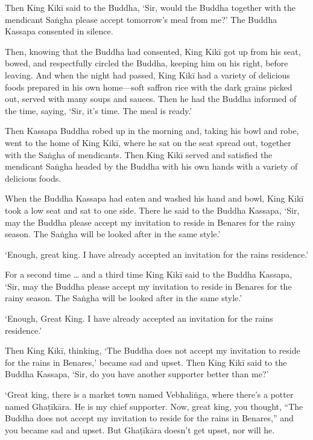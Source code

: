 \documentclass[12pt,openany]{book}%
\begin{document}
Then King \textsanskrit{Kikī} said to the Buddha, ‘Sir, would the Buddha together with the mendicant \textsanskrit{Saṅgha} please accept tomorrow’s meal from me?’ The Buddha Kassapa consented in silence. 

Then, knowing that the Buddha had consented, King \textsanskrit{Kikī} got up from his seat, bowed, and respectfully circled the Buddha, keeping him on his right, before leaving. And when the night had passed, King \textsanskrit{Kikī} had a variety of delicious foods prepared in his own home—soft saffron rice with the dark grains picked out, served with many soups and sauces. Then he had the Buddha informed of the time, saying, ‘Sir, it’s time. The meal is ready.’ 

Then Kassapa Buddha robed up in the morning and, taking his bowl and robe, went to the home of King \textsanskrit{Kikī}, where he sat on the seat spread out, together with the \textsanskrit{Saṅgha} of mendicants. Then King \textsanskrit{Kikī} served and satisfied the mendicant \textsanskrit{Saṅgha} headed by the Buddha with his own hands with a variety of delicious foods. 

When the Buddha Kassapa had eaten and washed his hand and bowl, King \textsanskrit{Kikī} took a low seat and sat to one side. There he said to the Buddha Kassapa, ‘Sir, may the Buddha please accept my invitation to reside in Benares for the rainy season. The \textsanskrit{Saṅgha} will be looked after in the same style.’ 

‘Enough, great king. I have already accepted an invitation for the rains residence.’ 

For a second time … and a third time King \textsanskrit{Kikī} said to the Buddha Kassapa, ‘Sir, may the Buddha please accept my invitation to reside in Benares for the rainy season. The \textsanskrit{Saṅgha} will be looked after in the same style.’ 

‘Enough, Great King. I have already accepted an invitation for the rains residence.’ 

Then King \textsanskrit{Kikī}, thinking, ‘The Buddha does not accept my invitation to reside for the rains in Benares,’ became sad and upset. Then King \textsanskrit{Kikī} said to the Buddha Kassapa, ‘Sir, do you have another supporter better than me?’ 

‘Great king, there is a market town named \textsanskrit{Vebhaliṅga}, where there’s a potter named \textsanskrit{Ghaṭīkāra}. He is my chief supporter. Now, great king, you thought, “The Buddha does not accept my invitation to reside for the rains in Benares,” and you became sad and upset. But \textsanskrit{Ghaṭīkāra} doesn’t get upset, nor will he. 
\end{document}
